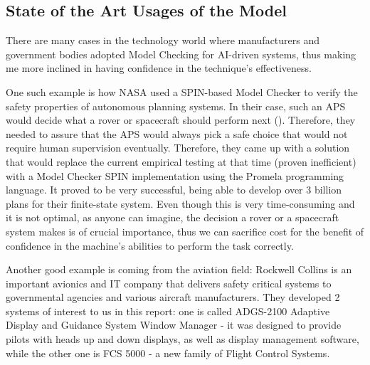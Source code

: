 \documentclass[paper=a4, fontsize=11pt]{scrartcl} %
\numberwithin{equation}{section} %
\numberwithin{figure}{section} %
\numberwithin{table}{section} %
\begin{document}

\subsection{State of the Art Usages of the Model}

\par
There are many cases in the technology world where manufacturers and government bodies adopted Model Checking for AI-driven systems, thus making me more inclined in having confidence in the technique's effectiveness. \\

\par
One such example is how NASA used a SPIN-based Model Checker to verify the safety properties of autonomous planning systems. In their case, such an APS  would decide what a rover or spacecraft should perform next (\cite{nasa-spin}). Therefore, they needed to assure that the APS would always pick a safe choice that would not require human supervision eventually. Therefore, they came up with a solution that would replace the current empirical testing at that time (proven inefficient) with a Model Checker SPIN implementation using the Promela programming language. It proved to be very successful, being able to develop over 3 billion plans for their finite-state system. Even though this is very time-consuming and it is not optimal, as anyone can imagine, the decision a rover or a spacecraft system makes is of crucial importance, thus we can sacrifice cost for the benefit of confidence in the machine's abilities to perform the task correctly. \\

\par
Another good example is coming from the aviation field: Rockwell Collins is an important avionics and IT company that delivers safety critical systems to governmental agencies and various aircraft manufacturers. They developed 2 systems of interest to us in this report: one is called ADGS-2100 Adaptive Display and Guidance System Window Manager - it was designed to provide pilots with heads up and down displays, as well as display management software, while the other one is FCS 5000 - a new family of Flight Control Systems. \\
\end{document}
